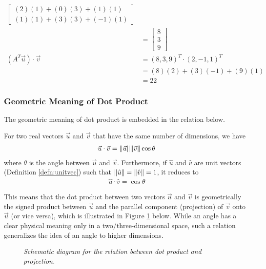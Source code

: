 \begin{solution}
\begin{align*}
\begin{bmatrix}
(2)(1) + (0)(3) + (1)(1) \\
(1)(1) + (3)(3) + (-1)(1) 
\end{bmatrix} \\
&=
\begin{bmatrix}
8 \\
3 \\
9
\end{bmatrix} \\
(A^T\vec{u}) \cdot \vec{v} &= (8,3,9)^T \cdot (2,-1,1)^T \\
&= (8)(2) + (3)(-1) + (9)(1) \\
&= 22
\end{align*}
\end{solution}

\subsubsection{Geometric Meaning of Dot Product}
The geometric meaning of dot product is embedded in the relation below.
\begin{proper}
\label{proper:dotgeo}
For two real vectors $\vec{u}$ and $\vec{v}$ that have the same number of dimensions, we have
\begin{align}
\vec{u} \cdot \vec{v} = \norm{\vec{u}}\norm{\vec{v}}\cos\theta \label{eqn:dotgeo}
\end{align}
where $\theta$ is the angle between $\vec{u}$ and $\vec{v}$. Furthermore, if $\hat{u}$ and $\hat{v}$ are unit vectors (Definition \ref{defn:unitvec}) such that $\norm{\hat{u}} = \norm{\hat{v}} = 1$, it reduces to
\begin{align}
\label{eqn:unitvecsangle}
\hat{u} \cdot \hat{v} = \cos\theta    
\end{align}
\end{proper}
This means that the dot product between two vectors $\vec{u}$ and $\vec{v}$ is geometrically the signed product between $\vec{u}$ and the parallel component (projection) of $\vec{v}$ onto $\vec{u}$ (or vice versa), which is illustrated in Figure \ref{fig:dotproj} below. While an angle has a clear physical meaning only in a two/three-dimensional space, such a relation generalizes the idea of an angle to higher dimensions.
\begin{figure}[h!]
    \centering
    \caption{\textit{Schematic diagram for the relation between dot product and projection.}}
    \label{fig:dotproj}
\end{figure}
